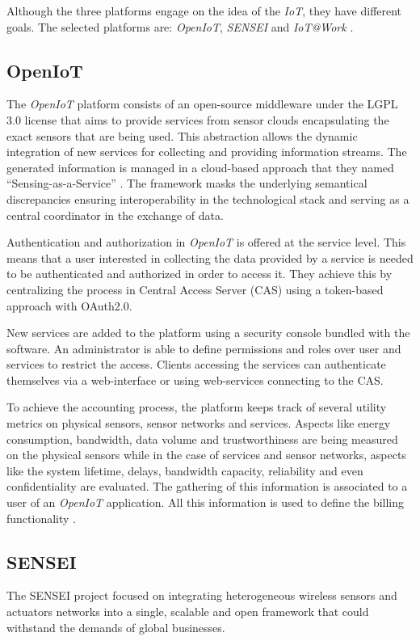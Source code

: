 \documentclass[journal]{IEEEtran}
\begin{document}
  Although the three platforms engage on the idea of the \emph{IoT}, they have different goals. The selected platforms are: \emph{OpenIoT}, \emph{SENSEI}  and \emph{IoT@Work} \cite{OpenIoT} \cite{SENSEI} \cite{IoTWork}.

  \subsection{OpenIoT}

  The \emph{OpenIoT} platform \cite{OpenIoTWeb} consists of an open-source middleware under the LGPL 3.0 license that aims to provide services from sensor clouds encapsulating the exact sensors that are being used. This abstraction allows the dynamic integration of new services for collecting and providing information streams. The generated information is managed in a cloud-based approach that they named ``Sensing-as-a-Service'' \cite{Baldini2012}.  The framework masks the underlying semantical discrepancies ensuring interoperability in the technological stack and serving as a central coordinator in the exchange of data.

  Authentication and authorization in \emph{OpenIoT} is offered at the service level. This means that a user interested in collecting the data provided by a service is needed to be authenticated and authorized in order to access it. They achieve this by centralizing the process in Central Access Server (CAS) using a token-based approach with OAuth2.0. 

  New services are added to the platform using a security console bundled with the software. An administrator is able to define permissions and roles over user and services to restrict the access. Clients accessing the services can authenticate themselves via a web-interface or using web-services connecting to the CAS.

  To achieve the accounting process, the platform keeps track of several utility metrics on physical sensors, sensor networks and services. Aspects like energy consumption, bandwidth, data volume and trustworthiness are being measured on the physical sensors while in the case of services and sensor networks, aspects like the system lifetime, delays, bandwidth capacity, reliability and even confidentiality are evaluated. The gathering of this information is associated to a user of an \emph{OpenIoT} application. All this information is used to define the billing functionality \cite{Calbimonte}.

  \subsection{SENSEI}
  The SENSEI project \cite{SENSEIWeb} focused on integrating heterogeneous wireless sensors and actuators networks into a single, scalable and open framework that could withstand the demands of global businesses.
  
\end{document}
